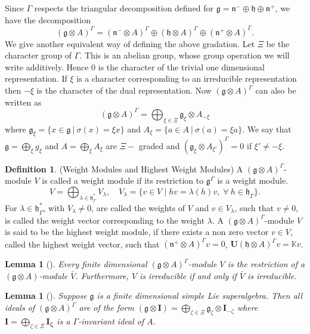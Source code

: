 \documentclass[11pt]{amsart}
\theoremstyle{plain}
\newtheorem{lemma}[thm]{Lemma}
\theoremstyle{definition}
\newtheorem{defn}[thm]{Definition}
\newcommand{\g}{\mathfrak{g}}
\newcommand{\h}{\mathfrak{h}}
\newcommand{\n}{\mathfrak{n}}
\begin{document}
Since $\Gamma$ respects the triangular decomposition defined for $\g=\n^-\oplus\h \oplus\n^+$, we have the decomposition
\begin{equation}
    (\g\otimes A)^\Gamma=(\n^-\otimes A)^\Gamma\oplus(\h\otimes A)^\Gamma\oplus(\n^+\otimes A)^\Gamma.
\end{equation}
We give another equivalent way of defining the above gradation. Let $\Xi$ be the character group of $\Gamma$. This is an abelian group, whose group operation we will write additively. Hence 0 is the character of the trivial one dimensional representation. If $\xi$ is a character corresponding to an irreducible representation then $-\xi$ is the character of the dual representation.
 Now $(\g\otimes A)^{\Gamma}$ can also be written as
\begin{equation}
    (\g\otimes A)^\Gamma=\bigoplus_{\xi\in\Xi}\g_\xi\otimes A_{-\xi}
\end{equation}
where $\g_{\xi}=\{x\in\g~|~\sigma(x)=\xi x\}$ and $A_{\xi}=\{a\in A~|~\sigma(a)=\xi a\}$.
We say that $\g=\bigoplus_\xi g_\xi$ and $A=\bigoplus_\xi A_\xi$ are $\Xi-$ graded and $(\g_\xi\otimes A_{\xi'})^\Gamma=0$ if $\xi'\neq-\xi$.
\begin{defn}(Weight Modules and Highest Weight Modules)
    A $(\g\otimes A)^{\Gamma}$-module $V$ is called a weight module if its restriction to $\g^{\Gamma}$ is a weight module.
    \begin{equation*}
        V=\bigoplus_{\lambda\in\h_{\Gamma}^*}V_{\lambda},\quad V_{\lambda}=\{v\in V \mid hv=\lambda(h)v, \; \forall~h\in\h_{\Gamma}\}.
    \end{equation*}
    For $\lambda\in\h_{\Gamma}^*$, with $V_{\lambda}\neq0$, are called the weights of $V$ and $v\in V_{\lambda}$, such that $v\neq0$, is called the weight vector corresponding to the weight $\lambda$.
    \smallskip
A $(\g\otimes A)^{\Gamma}$-module $V$ is said to be the highest weight module, if there exists a non zero vector $v\in V$, called the highest weight vector,  such that $(\n^+\otimes A)^{\Gamma}v=0$, $\mathbf{U}(\h\otimes A)^{\Gamma}v=\mathbb{K}v$.
 \end{defn}
\begin{lemma}[\cite{Sav14}]\label{lem:4}
    Every finite dimensional $(\g\otimes A)^{\Gamma}$-module $V$ is the restriction of a $(\g\otimes A)$-module $\bar{V}$. Furthermore, $V$ is irreducible if and only if $\bar{V}$ is irreducible.
\end{lemma}
\begin{lemma}[\cite{Sav14}]
Suppose $\g$ is a finite dimensional simple Lie superalgebra. Then all ideals of $(\g\otimes A)^\Gamma$ are of the form $(\g\otimes\mathbf{I})=\bigoplus_{\zeta\in\Xi}\g_\zeta\otimes\mathbf{I}_{-\zeta}$ where $\mathbf{I}=\bigoplus_{\zeta\in\Xi}\mathbf{I_\zeta}$ is a $\Gamma$-invariant ideal of $A$.
 \end{lemma}
\end{document}
